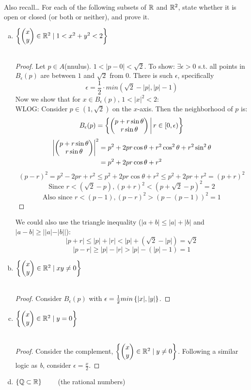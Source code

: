 Also recall\dots
{}
For each of the following subsets of $\mathbb{R}$ and $\mathbb{R}^2$, state whether it is open or closed (or both or neither), and prove it.
\begin{enumerate}[a.]
	\item $\left\{ \begin{pmatrix} x \\ y \end{pmatrix} \in \mathbb{R}^2 \mid 1 < x^2+y^2 < 2 \right\}$ \\
   \\
  \begin{proof}
		Let $p\in A$(nnulus). $1 < |p-0| < \sqrt{2}$. To show: $\exists \epsilon > 0$ s.t. all points in $B_\epsilon (p)$ are between $1$ and $\sqrt{2}$ from 0. There is such $\epsilon$, specifically
		\[\epsilon = \frac{1}{2}\cdot min(\sqrt{2}-\left|p\right|, \left|p\right| - 1)\]
    Now we show that for $x\in B_\epsilon (p)$, $1 < |x|^2 < 2$: \\
    WLOG: Consider $p\in (1,\sqrt{2})$ on the $x$-axis. Then the neighborhood of $p$ is:
    \[B_\epsilon (p) = \left\{ \begin{pmatrix} p+r \sin{\theta} \\ r \sin{\theta} \end{pmatrix} \,\middle\vert\, r\in [0,\epsilon) \right\}\]
    \begin{align*}
      \left| \begin{pmatrix} p+r \sin{\theta} \\ r \sin{\theta} \end{pmatrix} \right|^2 & = p^2 + 2pr \cos{\theta} + r^2\cos^2 \theta + r^2 \sin^2 \theta \\
      &= p^2 + 2pr \cos{\theta} + r^2
    \end{align*}
    \[(p-r)^2 = p^2 - 2pr + r^2 \leq p^2 + 2pr \cos{\theta} + r^2 \leq p^2 + 2pr+r^2 = (p+r)^2\]
    \[\text{Since }r  < (\sqrt{2}-p), (p+r)^2 < (p+\sqrt{2}-p)^2 = 2\]
    \[\text{Also since } r < (p-1), (p-r)^2 > \left(p-(p-1)\right)^2 = 1\]
	\end{proof}

We could also use the triangle inequality ($|a+b| \leq |a| + |b|$ and $|a-b|\geq ||a|-|b||$):
\[|p+r| \leq |p| + |r| < |p| + (\sqrt{2} - |p|) = \sqrt{2}\]
\[|p-r| \geq |p| - |r| > |p| - (|p| - 1) = 1\]

	\item $\left\{ \begin{pmatrix} x \\ y \end{pmatrix} \in \mathbb{R}^2 \mid xy\neq 0 \right\}$ \\
   \\
	\begin{proof}
    Consider $B_\epsilon (p)$ with $\epsilon = \frac{1}{2} min\left\{ |x|, |y| \right\}$.
	\end{proof}
	\item $\left\{ \begin{pmatrix} x \\ y \end{pmatrix} \in \mathbb{R}^2 \mid y=0 \right\}$ \\
   \\
  \begin{proof} Consider the complement, $\left\{ \begin{pmatrix} x \\ y \end{pmatrix} \in \mathbb{R}^2 \mid y\neq 0 \right\}$. Following a similar logic as \textit{b}, consider $\epsilon = \frac{x}{2}$.  \end{proof}
	\item $\left\{ \mathbb{Q} \subset \mathbb{R} \right\}\qquad$ (the rational numbers) \\
\end{enumerate}

